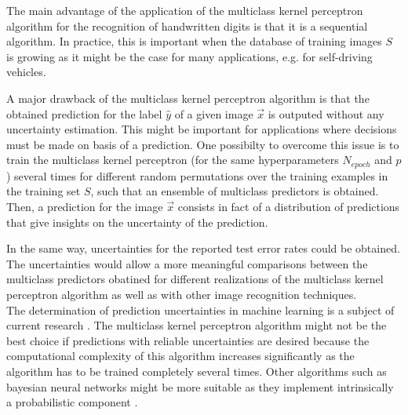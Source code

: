 The main advantage of the application of the multiclass kernel perceptron algorithm for the recognition of handwritten digits is that it is a sequential algorithm. In practice, this is important when the database of training images $S$ is growing as it might be the case for many applications, e.g. for self-driving vehicles.

A major drawback of the multiclass kernel perceptron algorithm is that the obtained prediction for the label $\hat{y}$ of a given image $\vec{x}$ is outputed without any uncertainty estimation. This might be important for applications where decisions must be made on basis of a prediction. One possibilty to overcome this issue is to train the multiclass kernel perceptron (for the same hyperparameters $N_{epoch}$ and $p$) several times for different random permutations over the training examples in the training set $S$, such that an ensemble of multiclass predictors is obtained. Then, a prediction for the image $\vec{x}$ consists in fact of a distribution of predictions that give insights on the uncertainty of the prediction. 

In the same way, uncertainties for the reported test error rates could be obtained. The uncertainties would allow a more meaningful comparisons between the multiclass predictors obatined for different realizations of the multiclass kernel perceptron algorithm as well as with other image recognition techniques.\\

The determination of prediction uncertainties in machine learning is a subject of current research \cite{dluncertainties2020}\cite{mluncertainties2007}. The multiclass kernel perceptron algorithm might not be the best choice if predictions with reliable uncertainties are desired because the computational complexity of this algorithm increases significantly as the algorithm has to be trained completely several times. Other algorithms such as bayesian neural networks might be more suitable as they implement intrinsically a probabilistic component \cite{bayesian2020}.